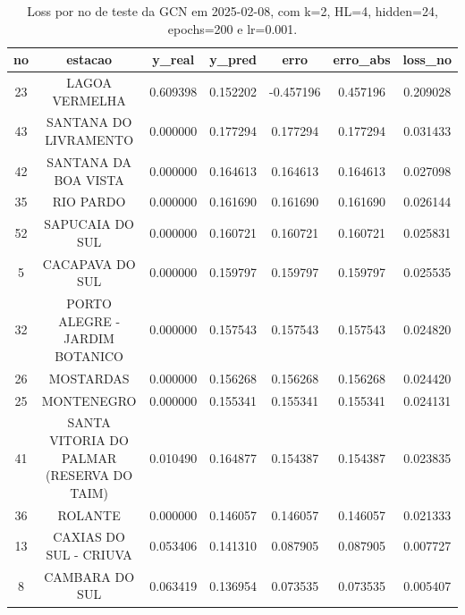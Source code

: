 \begin{table}[h]
\centering
\caption{Loss por no de teste da GCN em 2025-02-08, com k=2, HL=4, hidden=24, epochs=200 e lr=0.001.}
\label{tab:gcn_loss_k2_hl4_h24_e200_d20250208}
\begin{tabular}{ccccccc}
\toprule
no & estacao & y\_real & y\_pred & erro & erro\_abs & loss\_no \\
\midrule
23 & LAGOA VERMELHA & 0.609398 & 0.152202 & -0.457196 & 0.457196 & 0.209028 \\
43 & SANTANA DO LIVRAMENTO & 0.000000 & 0.177294 & 0.177294 & 0.177294 & 0.031433 \\
42 & SANTANA DA BOA VISTA & 0.000000 & 0.164613 & 0.164613 & 0.164613 & 0.027098 \\
35 & RIO PARDO & 0.000000 & 0.161690 & 0.161690 & 0.161690 & 0.026144 \\
52 & SAPUCAIA DO SUL & 0.000000 & 0.160721 & 0.160721 & 0.160721 & 0.025831 \\
5 & CACAPAVA DO SUL & 0.000000 & 0.159797 & 0.159797 & 0.159797 & 0.025535 \\
32 & PORTO ALEGRE - JARDIM BOTANICO & 0.000000 & 0.157543 & 0.157543 & 0.157543 & 0.024820 \\
26 & MOSTARDAS & 0.000000 & 0.156268 & 0.156268 & 0.156268 & 0.024420 \\
25 & MONTENEGRO & 0.000000 & 0.155341 & 0.155341 & 0.155341 & 0.024131 \\
41 & SANTA VITORIA DO PALMAR (RESERVA DO TAIM) & 0.010490 & 0.164877 & 0.154387 & 0.154387 & 0.023835 \\
36 & ROLANTE & 0.000000 & 0.146057 & 0.146057 & 0.146057 & 0.021333 \\
13 & CAXIAS DO SUL - CRIUVA & 0.053406 & 0.141310 & 0.087905 & 0.087905 & 0.007727 \\
8 & CAMBARA DO SUL & 0.063419 & 0.136954 & 0.073535 & 0.073535 & 0.005407 \\
\bottomrule
\end{tabular}
\end{table}
